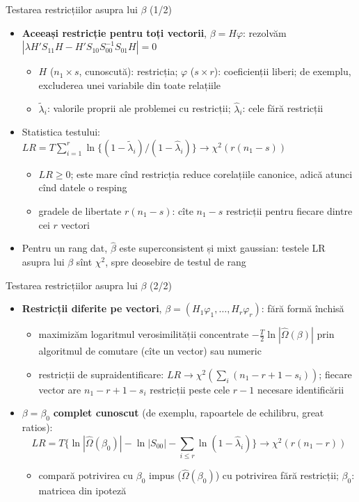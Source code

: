 \begin{frame}{Testarea restricțiilor asupra lui $\beta$ (1/2)}
\itemsize{\small}
\begin{itemize}
    \item \textbf{Aceeași restricție pentru toți vectorii}, $\beta = H\varphi$: rezolvăm $|\lambda H'S_{11}H - H'S_{10}S_{00}^{-1}S_{01}H| = 0$
    \begin{itemize}
        \item $H$ ($n_1\times s$, cunoscută): restricția; $\varphi$ ($s\times r$): coeficienții liberi; de exemplu, excluderea unei variabile din toate relațiile
        \item $\tilde\lambda_i$: valorile proprii ale problemei cu restricții; $\hat\lambda_i$: cele fără restricții
    \end{itemize}
    \item Statistica testului: $LR = T\sum_{i=1}^r\ln\{(1 - \tilde\lambda_i)/(1 - \hat\lambda_i)\} \to \chi^2(r(n_1 - s))$
    \begin{itemize}
        \item $LR \ge 0$; este mare cînd restricția reduce corelațiile canonice, adică atunci cînd datele o resping
        \item gradele de libertate $r(n_1 - s)$: cîte $n_1 - s$ restricții pentru fiecare dintre cei $r$ vectori
    \end{itemize}
    \item Pentru un rang dat, $\hat\beta$ este superconsistent și mixt gaussian: testele LR asupra lui $\beta$ sînt $\chi^2$, spre deosebire de testul de rang 
\end{itemize}
\end{frame}

\begin{frame}{Testarea restricțiilor asupra lui $\beta$ (2/2)}
\itemsize{\small}
\begin{itemize}
    \item \textbf{Restricții diferite pe vectori}, $\beta = (H_1\varphi_1, \dots, H_r\varphi_r)$: fără formă închisă
    \begin{itemize}
        \item maximizăm logaritmul verosimilității concentrate $-\tfrac{T}{2}\ln|\hat\Omega(\beta)|$ prin algoritmul de comutare (cîte un vector) sau numeric
        \item restricții de supraidentificare: $LR \to \chi^2(\sum_i(n_1 - r + 1 - s_i))$; fiecare vector are $n_1 - r + 1 - s_i$ restricții peste cele $r - 1$ necesare identificării
    \end{itemize}
    \item $\beta = \beta_0$ \textbf{complet cunoscut} (de exemplu, rapoartele de echilibru, great ratios): \[ LR = T\Big\{\ln|\hat\Omega(\beta_0)| - \ln|S_{00}| - \sum_{i\le r}\ln(1 - \hat\lambda_i)\Big\} \to \chi^2(r(n_1 - r)) \]
    \begin{itemize}
        \item compară potrivirea cu $\beta_0$ impus ($\hat\Omega(\beta_0)$) cu potrivirea fără restricții; $\beta_0$: matricea din ipoteză
    \end{itemize}
\end{itemize}
\end{frame}

